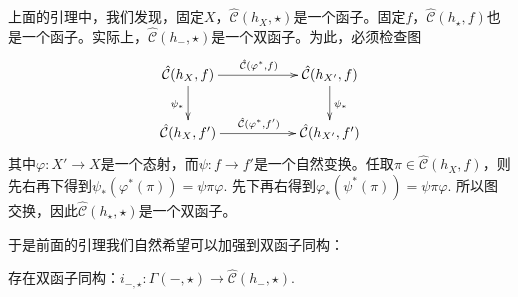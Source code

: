 

上面的引理中，我们发现，固定$X$，${\hat{\mathcal{C}}}(h_X,\star)$是一个函子。固定$f$，${\hat{\mathcal{C}}}(h_\star,f)$也是一个函子。实际上，${\hat{\mathcal{C}}}(h_-,\star)$是一个双函子。为此，必须检查图
\[
\begin{xy}
	\xymatrix{
		\hat{\mathcal{C}}(h_{X},f)\ar[rr]^{\hat{\mathcal{C}}(\varphi^*,f)} \ar[d]_{\psi_*}&&\hat{\mathcal{C}}(h_{X'},f) \ar[d]^{\psi_*}\\
		\hat{\mathcal{C}}(h_{X},f')\ar[rr]^{\hat{\mathcal{C}}(\varphi^*,f')}&&\hat{\mathcal{C}}(h_{X'},f')
	}
\end{xy}
\]
其中$\varphi:X'\to X$是一个态射，而$\psi:f\to f'$是一个自然变换。任取$\pi\in \hat{\mathcal{C}}(h_{X},f)$，则先右再下得到$\psi_*(\varphi^*(\pi))=\psi\pi\varphi$. 先下再右得到$\varphi_*(\psi^*(\pi))=\psi\pi\varphi$. 所以图交换，因此${\hat{\mathcal{C}}}(h_\star,\star)$是一个双函子。

于是前面的引理我们自然希望可以加强到双函子同构：

\begin{pro}[Yoneda引理]
存在双函子同构：$i_{-,\star}:\Gamma(-,\star)\to {\hat{\mathcal{C}}}(h_-,\star)$.
\end{pro}

